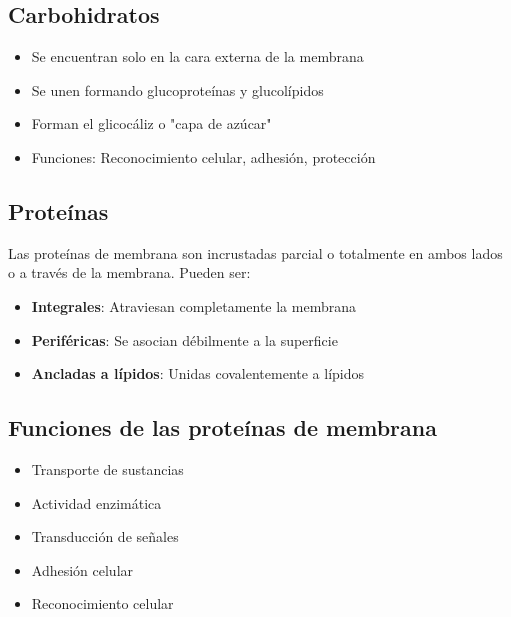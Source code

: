 \subsection{Carbohidratos}
\begin{itemize}
    \item Se encuentran solo en la cara externa de la membrana
    \item Se unen formando glucoproteínas y glucolípidos
    \item Forman el glicocáliz o "capa de azúcar"
    \item Funciones: Reconocimiento celular, adhesión, protección
\end{itemize}

\subsection{Proteínas}
Las proteínas de membrana son incrustadas parcial o totalmente en ambos lados o a través de la membrana. Pueden ser:

\begin{itemize}
    \item \textbf{Integrales}: Atraviesan completamente la membrana
    \item \textbf{Periféricas}: Se asocian débilmente a la superficie
    \item \textbf{Ancladas a lípidos}: Unidas covalentemente a lípidos
\end{itemize}

\subsection{Funciones de las proteínas de membrana}
\begin{itemize}
    \item Transporte de sustancias
    \item Actividad enzimática
    \item Transducción de señales
    \item Adhesión celular
    \item Reconocimiento celular
\end{itemize}